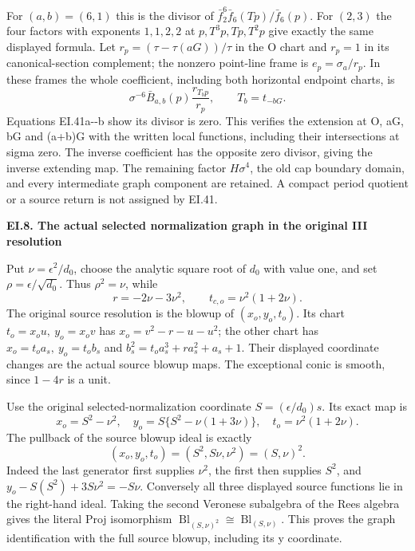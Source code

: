 For \((a,b)=(6,1)\) this is the divisor of
\(\bar f_2^6\bar f_6(Tp)/\bar f_6(p)\). For \((2,3)\)
the four factors with exponents \(1,1,2,2\) at
\(p,T^3p,Tp,T^2p\) give exactly the same displayed formula.
Let \(r_p=(\tau-\tau(aG))/\tau\) in the O chart and
\(r_p=1\) in its canonical-section complement; the nonzero
point-line frame is \(e_p=\sigma_a/r_p\). In these frames the
whole coefficient, including both horizontal endpoint charts, is
\[
 \sigma^{-6}\bar B_{a,b}(p)
          \frac{r_{T_bp}}{r_p},\qquad T_b=t_{-bG}.
 \tag{EI.41c}
\]
Equations EI.41a-\/-b show its divisor is zero. This verifies the
extension at O, aG, bG and (a+b)G with the written local functions,
including their intersections at sigma zero. The inverse coefficient
has the opposite zero divisor, giving the inverse extending map.
The remaining factor \(H\sigma^4\), the old cap boundary domain,
and every intermediate graph component are retained. A compact
period quotient or a source return is not assigned by EI.41.

\par

\medskip\noindent\textbf{EI.8. The actual selected normalization graph in the original III resolution}

\par\nobreak

Put \(\nu=\epsilon^2/d_0\), choose the analytic square root of
\(d_0\) with value one, and set \(\rho=\epsilon/\sqrt{d_0}\).
Thus \(\rho^2=\nu\), while
\[
 r=-2\nu-3\nu^2,\qquad t_{c,o}=\nu^2(1+2\nu).
 \tag{EI.42}
\]
The original source resolution is the blowup of
\((x_o,y_o,t_o)\). Its chart \(t_o=x_ou,\ y_o=x_ov\) has
\(x_o=v^2-r-u-u^2\); the other chart has
\(x_o=t_o a_s,\ y_o=t_o b_s\) and
\(b_s^2=t_o a_s^3+r a_s^2+a_s+1\).
Their displayed coordinate changes are the actual source blowup maps.
The exceptional conic is smooth, since \(1-4r\) is a unit.

Use the original selected-normalization coordinate
\(S=(\epsilon/d_0)s\). Its exact map is
\[
 x_o=S^2-\nu^2,\quad
 y_o=S\{S^2-\nu(1+3\nu)\},\quad
 t_o=\nu^2(1+2\nu).
 \tag{EI.43}
\]
The pullback of the source blowup ideal is exactly
\[
 (x_o,y_o,t_o)=(S^2,S\nu,\nu^2)=(S,\nu)^2.
 \tag{EI.44}
\]
Indeed the last generator first supplies \(\nu^2\), the first
then supplies \(S^2\), and
\(y_o-S(S^2)+3S\nu^2=-S\nu\). Conversely all three
displayed source functions lie in the right-hand ideal. Taking
the second Veronese subalgebra of the Rees algebra gives the
literal Proj isomorphism
\(\operatorname{Bl}_{(S,\nu)^2}\cong\operatorname{Bl}_{(S,\nu)}\).
This proves the graph identification with the full source blowup,
including its y coordinate.


